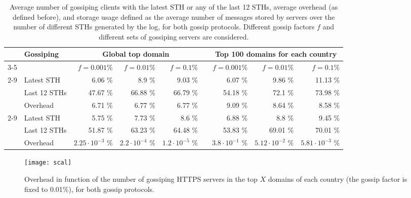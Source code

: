 \begin{table*}
\centering
\small
\renewcommand{\arraystretch}{0.95}

\begin{tabular}{@{}rm{60pt}rrrcrrr@{}}
\toprule
&\multirow{2}{*}{\vspace{-0.35em}Gossiping} & \multicolumn{3}{c}{Global top domain} & \phantom{abc} & \multicolumn{3}{c}{Top 100 domains for each country} \\
\cmidrule{3-5} \cmidrule{7-9}
&& $f=0.001 \%$ & $f=0.01 \%$ & $f=0.1 \%$ && $f=0.001 \%$ & $f=0.01 \%$ & $f=0.1 \%$ \\
\cmidrule{2-9}
\multirow{3}{*}{\begin{turn}{90}Prot. 1\end{turn}} & Latest STH & 6.06 \% & 8.9 \% & 9.03 \% && 6.07 \% & 9.86 \% & 11.13 \% \\
& Last 12 STHs & 47.67 \% & 66.88 \% & 66.79 \% && 54.18 \% & 72.1 \% & 73.98 \% \\
& Overhead & 6.71 \% & 6.77 \% & 6.77 \% && 9.09 \% & 8.64 \% & 8.58 \% \\
\cmidrule{2-9}
\multirow{3}{*}{\begin{turn}{90}Prot. 2\end{turn}} & Latest STH & 5.75 \% & 7.73 \% & 8.6 \% && 6.88 \% & 8.8 \% & 9.45 \% \\
& Last 12 STHs & 51.87 \% & 63.23 \% & 64.48 \% && 53.83 \% & 69.01 \% & 70.01 \% \\
& Overhead & $2.25 \cdot 10^{-3}$ \% & $2.2 \cdot 10^{-4}$ \% & $1.2 \cdot 10^{-5}$ \% && $3.8 \cdot 10^{-1}$ \% & $5.12 \cdot 10^{-2}$ \% & $5.81 \cdot 10^{-3}$ \% \\
\bottomrule
\end{tabular}

\smallskip{}
\caption{Average number of gossiping clients with the latest STH or any of the last 12 STHs, average overhead (as defined before), and storage usage defined as the average number of messages stored by servers over the number of different STHs generated by the log, for both gossip protocols. Different gossip factors $f$ and different sets of gossiping servers are considered.}
\label{tab:scalability}
\end{table*}

\begin{figure}
\centering
\texttt{[image: scal]}
\caption{Overhead in function of the number of gossiping HTTPS servers in the top $X$ domains of each country (the gossip factor is fixed to 0.01\%), for both gossip protocols.}
\label{fig:scalability}
\end{figure}
